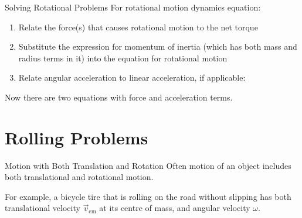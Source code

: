 \documentclass[12pt,compress,aspectratio=169]{beamer}
\begin{document}
\begin{frame}{Solving Rotational Problems}
  For rotational motion dynamics equation:
  \begin{enumerate}
  \item Relate the force(s) that causes rotational motion to the net torque

  \item Substitute the expression for momentum of inertia (which has both mass
    and radius terms in it) into the equation for rotational motion
  \item Relate angular acceleration to linear acceleration, if applicable:

  \end{enumerate}
  Now there are two equations with force and acceleration terms.
\end{frame}




\section{Rolling Problems}


\begin{frame}{Motion with Both Translation and Rotation}
  Often motion of an object includes both translational and rotational motion.
  \begin{center}
  \end{center}
  For example, a bicycle tire that is rolling on the road without slipping has
  both translational velocity $\vec v_\text{cm}$ at its centre of mass, and
  angular velocity $\omega$.
\end{frame}
\end{document}

